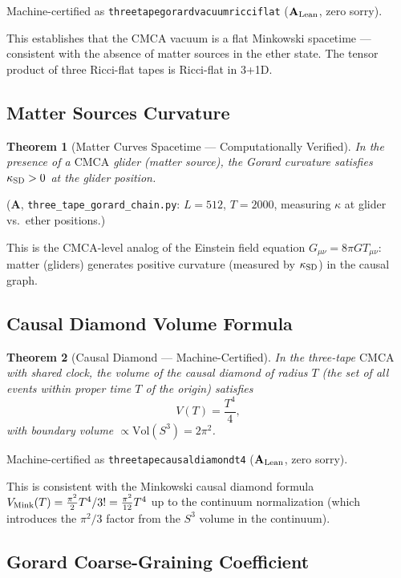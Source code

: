 \documentclass[11pt]{article}
\newtheorem{theorem}{Theorem}[section]
\theoremstyle{remark}
\newcommand{\lean}[1]{%
  \penalty-100
  \begingroup\def\_{\textunderscore\allowbreak}\texttt{#1}\endgroup}
\newcommand{\CatA}{\textbf{A}}
\newcommand{\CatAL}{\ensuremath{\textbf{A}_{\rm Lean}}}
\newcommand{\CMCA}{\text{CMCA}}
\begin{document}
Machine-certified as \lean{three\_tape\_gorard\_vacuum\_ricci\_flat}
($\CatAL$, zero sorry).

This establishes that the $\CMCA$ vacuum is a flat Minkowski spacetime
— consistent with the absence of matter sources in the ether state. The
tensor product of three Ricci-flat tapes is Ricci-flat in 3+1D.

\subsection{Matter Sources Curvature}

\begin{theorem}[Matter Curves Spacetime --- Computationally Verified]
\label{thm:matter-curves}
In the presence of a $\CMCA$ glider (matter source), the Gorard curvature
satisfies $\kappa_{\rm SD} > 0$ at the glider position.
\end{theorem}
($\CatA$, \texttt{three\_tape\_gorard\_chain.py}: $L = 512$, $T = 2000$,
measuring $\kappa$ at glider vs.\ ether positions.)

This is the $\CMCA$-level analog of the Einstein field equation
$G_{\mu\nu} = 8\pi G T_{\mu\nu}$: matter (gliders) generates positive
curvature (measured by $\kappa_{\rm SD}$) in the causal graph.

\subsection{Causal Diamond Volume Formula}

\begin{theorem}[Causal Diamond --- Machine-Certified]
\label{thm:causal-diamond}
In the three-tape $\CMCA$ with shared clock, the volume of the causal
diamond of radius $T$ (the set of all events within proper time $T$ of
the origin) satisfies
\begin{equation}
  V(T) = \frac{T^4}{4},
  \label{eq:causal-diamond}
\end{equation}
with boundary volume $\propto \mathrm{Vol}(S^3) = 2\pi^2$.
\end{theorem}
Machine-certified as \lean{three\_tape\_causal\_diamond\_t4}
($\CatAL$, zero sorry).

This is consistent with the Minkowski causal diamond formula
$V_{\rm Mink}(T) = \tfrac{\pi^2}{2} T^4 / 3! = \tfrac{\pi^2}{12} T^4$ up
to the continuum normalization (which introduces the $\pi^2/3$ factor from
the $S^3$ volume in the continuum).

\subsection{Gorard Coarse-Graining Coefficient}
\end{document}
